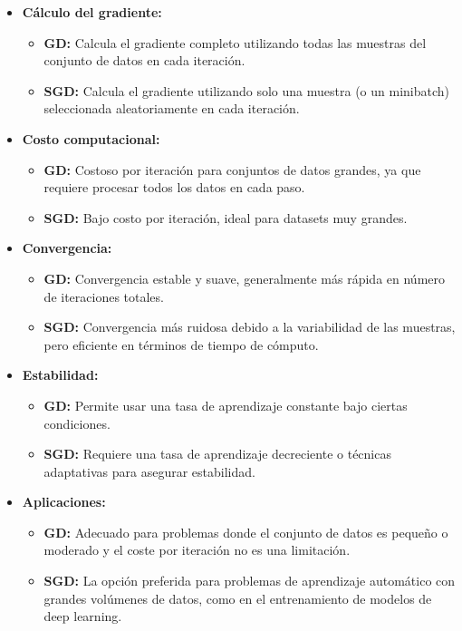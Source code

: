 \documentclass[12pt, letterpaper,conference]{IEEEtran}
\begin{document}
\begin{itemize}
    \item \textbf{Cálculo del gradiente:}
    \begin{itemize}
        \item \textbf{GD:} Calcula el gradiente completo utilizando todas las muestras del conjunto de datos en cada iteración.
        \item \textbf{SGD:} Calcula el gradiente utilizando solo una muestra (o un minibatch) seleccionada aleatoriamente en cada iteración.
    \end{itemize}
    
    \item \textbf{Costo computacional:}
    \begin{itemize}
        \item \textbf{GD:} Costoso por iteración para conjuntos de datos grandes, ya que requiere procesar todos los datos en cada paso.
        \item \textbf{SGD:} Bajo costo por iteración, ideal para datasets muy grandes.
    \end{itemize}
    
    \item \textbf{Convergencia:}
    \begin{itemize}
        \item \textbf{GD:} Convergencia estable y suave, generalmente más rápida en número de iteraciones totales.
        \item \textbf{SGD:} Convergencia más ruidosa debido a la variabilidad de las muestras, pero eficiente en términos de tiempo de cómputo.
    \end{itemize}
    
    \item \textbf{Estabilidad:}
    \begin{itemize}
        \item \textbf{GD:} Permite usar una tasa de aprendizaje constante bajo ciertas condiciones.
        \item \textbf{SGD:} Requiere una tasa de aprendizaje decreciente o técnicas adaptativas para asegurar estabilidad.
    \end{itemize}
    
    \item \textbf{Aplicaciones:}
    \begin{itemize}
        \item \textbf{GD:} Adecuado para problemas donde el conjunto de datos es pequeño o moderado y el coste por iteración no es una limitación.
        \item \textbf{SGD:} La opción preferida para problemas de aprendizaje automático con grandes volúmenes de datos, como en el entrenamiento de modelos de deep learning.
    \end{itemize}
\end{itemize}
\end{document}
